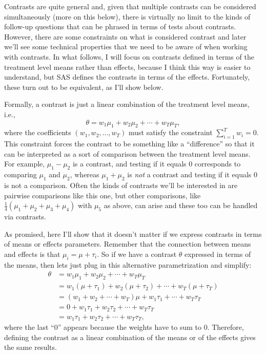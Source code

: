 \documentclass[a4paper, 12pt]{article}
\theoremstyle{plain}
\theoremstyle{definition}
\theoremstyle{remark}
\begin{document}
Contrasts are quite general and, given that multiple contrasts can be considered simultaneously (more on this below), there is virtually no limit to the kinds of follow-up questions that can be phrased in terms of tests about contrasts.  However, there are some constraints on what is considered contrast and later we'll see some technical properties that we need to be aware of when working with contrasts.  In what follows, I will focus on contrasts defined in terms of the treatment level means rather than effects, because I think this way is easier to understand, but SAS defines the contrasts in terms of the effects.  Fortunately, these turn out to be equivalent, as I'll show below.  

Formally, a contrast is just a linear combination of the treatment level means, i.e., 
\[ \theta = w_1 \mu_1 + w_2 \mu_2 + \cdots + w_T \mu_T, \]
where the coefficients $(w_1,w_2,\ldots,w_T)$ must satisfy the constraint $\sum_{i=1}^T w_i = 0$.  This constraint forces the contrast to be something like a ``difference'' so that it can be interpreted as a sort of comparison between the treatment level means.  For example, $\mu_1 - \mu_2$ is a contrast, and testing if it equals 0 corresponds to comparing $\mu_1$ and $\mu_2$, whereas $\mu_1 + \mu_2$ is {\em not} a contrast and testing if it equals 0 is not a comparison.  Often the kinds of contrasts we'll be interested in are pairwise comparisons like this one, but other comparisons, like $\frac14(\mu_1 + \mu_2 + \mu_3 + \mu_4)$ with $\mu_5$ as above, can arise and these too can be handled via contrasts.  

As promised, here I'll show that it doesn't matter if we express contrasts in terms of means or effects parameters.  Remember that the connection between means and effects is that $\mu_i = \mu + \tau_i$.  So if we have a contrast $\theta$ expressed in terms of the means, then lets just plug in this alternative parametrization and simplify:
\begin{align*}
\theta & = w_1 \mu_1 + w_2 \mu_2 + \cdots + w_T \mu_T \\
& = w_1 (\mu + \tau_1) + w_2 (\mu + \tau_2) + \cdots + w_T(\mu + \tau_T) \\
& = (w_1 + w_2 + \cdots + w_T) \mu + w_1 \tau_1 + \cdots + w_T \tau_T \\
& = 0 + w_1 \tau_1 + w_2 \tau_2 + \cdots + w_T \tau_T \\
& = w_1 \tau_1 + w_2 \tau_2 + \cdots + w_T \tau_T,
\end{align*}
where the last ``0'' appears because the weights have to sum to 0.  Therefore, defining the contrast as a linear combination of the means or of the effects gives the same results.  
\end{document}
